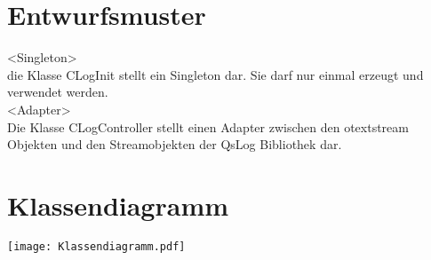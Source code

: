 \section{Entwurfsmuster}
<Singleton>
\\die Klasse CLogInit stellt ein Singleton dar. Sie darf nur einmal erzeugt und verwendet werden.
\\<Adapter>
\\Die Klasse CLogController stellt einen Adapter zwischen den otextstream Objekten und den Streamobjekten der QsLog Bibliothek dar.
\newpage
\section{Klassendiagramm}
\texttt{[image: Klassendiagramm.pdf]}
